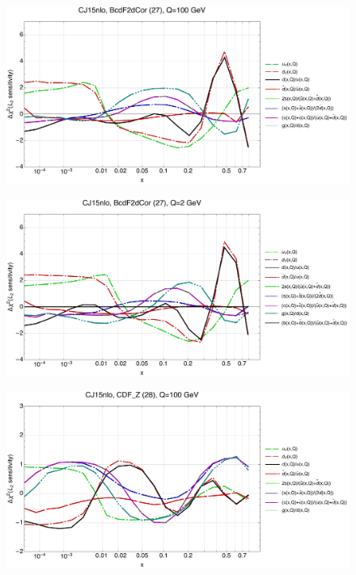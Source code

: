 \documentclass[10pt,aps,prd,floatfix,titlepage]{revtex4}
\begin{document}
\clearpage
\begin{figure}
\includegraphics[width=\textwidth,height=0.44\textheight,keepaspectratio]{2/27_CJ15nlo_q100_Sf_2.pdf}
\caption{}
\end{figure}
\begin{figure}
\includegraphics[width=\textwidth,height=0.44\textheight,keepaspectratio]{2/27_CJ15nlo_q2_Sf_2.pdf}
\caption{}
\end{figure}
\clearpage
\begin{figure}
\includegraphics[width=\textwidth,height=0.44\textheight,keepaspectratio]{2/28_CJ15nlo_q100_Sf_2.pdf}
\caption{}
\end{figure}
\end{document}
